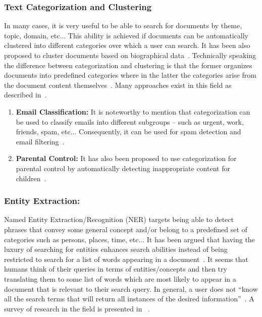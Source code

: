 \documentclass[a4,12pt]{report}
\begin{document}
	\subsubsection{Text Categorization and Clustering} 
		In many cases, it is very useful to be able to search for documents by theme, topic, domain, etc...
		This ability is achieved if documents can be automatically clustered into different categories over which a user can search. It has been also 
		proposed to cluster documents based on biographical data~\cite{Kostoff:99}. Technically speaking the difference between categorization and
		clustering is that the former organizes documents into predefined categories where in the latter the categories arise from the document content
		themselves~\cite{sharp:01}. Many approaches exist in this field as described in~\cite{Berry:03, Aas:99, MUNTEANU:05}.
		\begin{enumerate}
		\item \textbf{Email Classification:} It is noteworthy to mention that categorization can be used to classify emails into different subgroups
			-- such as urgent, work, friends, spam, etc... Consequently, it can be used for spam detection and email 
			filtering~\cite{Mock:01,bekkerman:04}.
		\item \textbf{Parental Control:} It has also been proposed to use categorization for parental control by
			automatically detecting inappropriate content for children~\cite{Kontostathis:09}.
		\end{enumerate}
	\subsubsection{Entity Extraction:} Named Entity Extraction/Recognition (NER) targets being able to detect phrases that convey some general concept
		and/or belong to a predefined set of categories such as persons, places, time, etc... It has been argued that having the luxury of searching
		for entities enhances search abilities instead of being restricted to search for a list of words appearing in a document~\cite{basis:06}. 
		It seems that humans think of their
		queries in terms of entities/concepts and then try translating them to some list of words which are most likely to appear in a document that
		is relevant to their search query. In general, a user does not ``know all the search terms that will return all instances of the desired
		information''~\cite{basis:06}. A survey of research in the field is presented in ~\cite{Nadeau:07}. 
	
\end{document}
